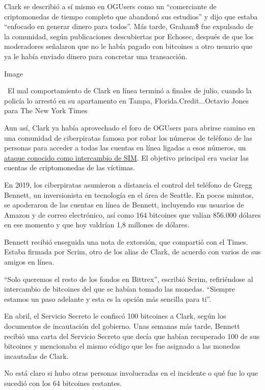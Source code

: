 Clark se describió a sí mismo en OGUsers como un ``comerciante de
criptomonedas de tiempo completo que abandonó sus estudios'' y dijo que
estaba ``enfocado en generar dinero para todos''. Más tarde, Graham\$
fue expulsado de la comunidad, según publicaciones descubiertas por
Echosec, después de que los moderadores señalaron que no le había pagado
con bitcoines a otro usuario que ya le había enviado dinero para
concretar una transacción.

Image

~El mal comportamiento de Clark en línea terminó a finales de julio,
cuando la policía lo arrestó en su apartamento en Tampa,
Florida.Credit...Octavio Jones para The New York Times

Aun así, Clark ya había aprovechado el foro de OGUsers para abrirse
camino en una comunidad de ciberpiratas famosa por robar los números de
teléfono de las personas para acceder a todas las cuentas en línea
ligadas a esos números, un
\href{https://www.nytimes.com/2017/08/21/business/dealbook/phone-hack-bitcoin-virtual-currency.html}{ataque
conocido como intercambio de SIM}. El objetivo principal era vaciar las
cuentas de criptomonedas de las víctimas.

En 2019, los ciberpiratas asumieron a distancia el control del teléfono
de Gregg Bennett, un inversionista en tecnología en el área de Seattle.
En pocos minutos, se apoderaron de las cuentas en línea de Bennett,
incluyendo sus usuarios de Amazon y de correo electrónico, así como 164
bitcoines que valían 856.000 dólares en ese momento y que hoy valdrían
1,8 millones de dólares.

Bennett recibió enseguida una nota de extorsión, que compartió con el
Times. Estaba firmada por Scrim, otro de los alias de Clark, de acuerdo
con varios de sus amigos en línea.

``Solo queremos el resto de los fondos en Bittrex'', escribió Scrim,
refiriéndose al intercambio de bitcoines del que se habían tomado las
monedas. ``Siempre estamos un paso adelante y esta es la opción más
sencilla para ti''.

En abril, el Servicio Secreto le confiscó 100 bitcoines a Clark, según
los documentos de incautación del gobierno. Unas semanas más tarde,
Bennett recibió una carta del Servicio Secreto que decía que habían
recuperado 100 de sus bitcoines y mencionaba el mismo código que les fue
asignado a las monedas incautadas de Clark.

No está claro si hubo otras personas involucradas en el incidente o qué
fue lo que sucedió con los 64 bitcoines restantes.

